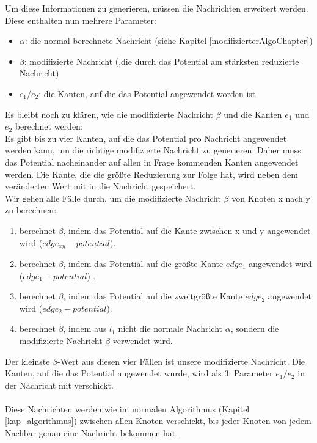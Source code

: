 	Um diese Informationen zu generieren, müssen die Nachrichten erweitert werden.
	Diese enthalten nun mehrere Parameter:
	\begin{itemize}
		\item $\alpha$: die normal berechnete Nachricht (siehe Kapitel \ref{modifizierterAlgoChapter})
		\item $\beta$: modifizierte Nachricht (,die durch das Potential am stärksten reduzierte Nachricht)
		\item $e_{1} / e_{2}$: die Kanten, auf die das Potential angewendet worden ist
	\end{itemize}
	Es bleibt noch zu klären, wie die modifizierte Nachricht $\beta$ und die Kanten $e_{1}$ und $e_{2}$ berechnet werden:\\
	Es gibt bis zu vier Kanten, auf die das Potential pro Nachricht angewendet werden kann, um die richtige modifizierte Nachricht zu generieren. Daher muss das Potential nacheinander auf allen in Frage kommenden Kanten angewendet werden. Die Kante, die die größte Reduzierung zur Folge hat, wird neben dem veränderten Wert mit in die Nachricht gespeichert. \\
	Wir gehen alle Fälle durch, um die modifizierte Nachricht $\beta$ von Knoten x nach y zu berechnen:
	\begin{enumerate}
		\item berechnet $\beta$, indem das Potential auf die Kante zwischen x und y angewendet wird ($edge_{xy} - potential$).
		\item berechnet $\beta$, indem das Potential auf die größte Kante $edge_{1}$ angewendet wird ($edge_{1} - potential$) .
		\item berechnet $\beta$, indem das Potential auf die zweitgrößte Kante $edge_{2}$ angewendet wird ($edge_{2} - potential$).
		\item berechnet $\beta$, indem aus $l_{1}$ nicht die normale Nachricht $\alpha$, sondern die modifizierte Nachricht $\beta$ verwendet wird.
	\end{enumerate}
	Der kleinste $\beta$-Wert aus diesen vier Fällen ist unsere modifizierte Nachricht. Die Kanten, auf die das Potential angewendet wurde, wird als 3. Parameter $e_{1} / e_{2}$ in der Nachricht mit verschickt.
	\\
	\\
	Diese Nachrichten werden wie im normalen Algorithmus (Kapitel \ref{kap_algorithmus}) zwischen allen Knoten verschickt, bis jeder Knoten von jedem Nachbar genau eine Nachricht bekommen hat.
	
